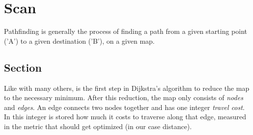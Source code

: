 \chapter{Scan}\label{ch:scan}
Pathfinding is generally the process of finding a path from a given starting point ('A')
to a given destination ('B'),
on a given map.

\section{Section}\label{sec:scan}
Like with many others,
is the first step in Dijkstra's algorithm to reduce the map to the necessary minimum.
After this reduction, the map only consists of \emph{nodes} and \emph{edges}.
An edge connects two nodes together and has one integer \emph{travel cost}.
In this integer is stored how much it costs to traverse along that edge,
measured in the metric that should get optimized (in our case distance).
